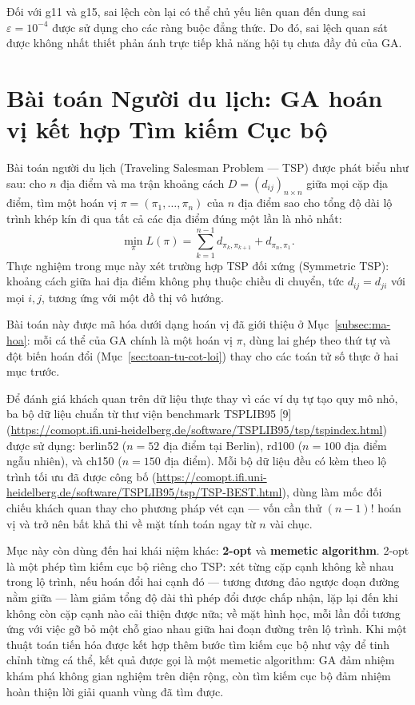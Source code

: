 Đối với g11 và g15, sai lệch còn lại có thể chủ yếu liên quan đến
dung sai $\varepsilon = 10^{-4}$ được sử dụng cho các ràng buộc đẳng
thức. Do đó, sai lệch quan sát được không nhất thiết phản ánh trực
tiếp khả năng hội tụ chưa đầy đủ của GA.

\section{Bài toán Người du lịch: GA hoán vị kết hợp Tìm kiếm Cục bộ}
\label{sec:ud-tsp}

Bài toán người du lịch (Traveling Salesman Problem — TSP) được phát
biểu như sau: cho $n$ địa điểm và ma trận khoảng cách
$D = (d_{ij})_{n\times n}$ giữa mọi cặp địa điểm, tìm một hoán vị
$\pi = (\pi_1, \ldots, \pi_n)$ của $n$ địa điểm sao cho tổng độ dài lộ
trình khép kín đi qua tất cả các địa điểm đúng một lần là nhỏ nhất:
\begin{equation}
\min_{\pi} L(\pi) = \sum_{k=1}^{n-1} d_{\pi_k, \pi_{k+1}} + d_{\pi_n, \pi_1}.
\label{eq:tsp}
\end{equation}
Thực nghiệm trong mục này xét trường hợp TSP đối xứng (Symmetric
TSP): khoảng cách giữa hai địa điểm không phụ thuộc chiều di chuyển,
tức $d_{ij} = d_{ji}$ với mọi $i, j$, tương ứng với một đồ thị vô
hướng.

Bài toán này được mã hóa dưới dạng hoán vị đã giới thiệu ở
Mục~\ref{subsec:ma-hoa}: mỗi cá thể của GA chính là một hoán vị $\pi$,
dùng lai ghép theo thứ tự và đột biến hoán đổi
(Mục~\ref{sec:toan-tu-cot-loi})
thay cho các toán tử số thực ở hai mục trước.

Để đánh giá khách quan trên dữ liệu thực thay vì các ví dụ tự tạo quy
mô nhỏ, ba bộ dữ liệu chuẩn từ thư viện benchmark TSPLIB95 [9]
(\url{https://comopt.ifi.uni-heidelberg.de/software/TSPLIB95/tsp/tspindex.html})
được sử dụng: berlin52 ($n=52$ địa điểm tại Berlin), rd100 ($n=100$
địa điểm ngẫu nhiên), và ch150 ($n=150$ địa điểm). Mỗi bộ dữ liệu đều
có kèm theo lộ trình tối ưu đã được công bố
(\url{https://comopt.ifi.uni-heidelberg.de/software/TSPLIB95/tsp/TSP-BEST.html}),
dùng làm mốc đối chiếu khách quan thay cho phương pháp vét cạn — vốn
cần thử $(n-1)!$ hoán vị và trở nên bất khả thi về mặt tính toán ngay
từ $n$ vài chục.

Mục này còn dùng đến hai khái niệm khác: \textbf{2-opt} và
\textbf{memetic algorithm}. 2-opt là một phép tìm kiếm cục bộ riêng
cho TSP: xét từng cặp cạnh không kề nhau trong lộ trình, nếu hoán đổi
hai cạnh đó — tương đương đảo ngược đoạn đường nằm giữa — làm giảm
tổng độ dài thì phép đổi được chấp nhận, lặp lại đến khi không còn cặp
cạnh nào cải thiện được nữa; về mặt hình học, mỗi lần đổi tương ứng với
việc gỡ bỏ một chỗ giao nhau giữa hai đoạn đường trên lộ trình. Khi một
thuật toán tiến hóa được kết hợp thêm bước tìm kiếm cục bộ như vậy để
tinh chỉnh từng cá thể, kết quả được gọi là một memetic algorithm: GA
đảm nhiệm khám phá không gian nghiệm trên diện rộng, còn tìm kiếm cục
bộ đảm nhiệm hoàn thiện lời giải quanh vùng đã tìm được.

